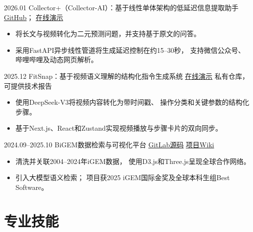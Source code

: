 \documentclass[10pt,a4paper,sans]{moderncv}
\begin{document}
\cventry
  {2026.01}
  {Collector+（Collector-AI）：基于线性单体架构的低延迟信息提取助手}
  {\href{https://github.com/YifeiWang0618/Creator_ai}{GitHub}；
  \href{https://collectorai.top/}{在线演示}}
  {}
  {}
  {
    \begin{itemize}
      \item 将长文与视频转化为二元预测问题，并支持基于原文的问答。
      \item 采用FastAPI异步线性管道将生成延迟控制在约15--30秒，
      支持微信公众号、哔哩哔哩及动态网页解析。
    \end{itemize}
  }

\cventry
  {2025.12}
  {FitSnap：基于视频语义理解的结构化指令生成系统}
  {\href{https://fit-snap-beige.vercel.app/}{在线演示}}
  {}
  {私有仓库，可提供技术报告}
  {
    \begin{itemize}
      \item 使用DeepSeek-V3将视频内容转化为带时间戳、
      操作分类和关键参数的结构化步骤。
      \item 基于Next.js、React和Zustand实现视频播放与步骤卡片的双向同步。
    \end{itemize}
  }

\cventry
  {2024.09--2025.10}
  {BiGEM数据检索与可视化平台}
  {\href{https://gitlab.igem.org/2025/software-tools/bit-china}{GitLab源码}}
  {}
  {\href{https://2025.igem.wiki/bit-china/}{项目Wiki}}
  {
    \begin{itemize}
      \item 清洗并关联2004--2024年iGEM数据，
      使用D3.js和Three.js呈现全球合作网络。
      \item 引入大模型语义检索；
      项目获2025 iGEM国际金奖及全球本科生组Best Software。
    \end{itemize}
  }


\section{专业技能}

\end{document}
